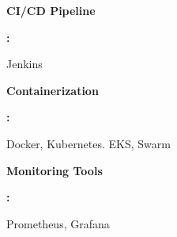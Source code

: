 \documentclass[9pt]{developercv} %
\begin{document}
\begin{minipage}[t]{0.465\textwidth}
    \begin{minipage}[t]{0.3\textwidth}
        \textbf{CI/CD Pipeline}
    \end{minipage}
     \begin{minipage}[t]{0.1\textwidth}
        \textbf{:}
    \end{minipage}
    \hfill
    \begin{minipage}[t]{0.73\textwidth}
      Jenkins
    \end{minipage}

    \begin{minipage}[t]{0.3\textwidth}
        \textbf{Containerization}
    \end{minipage}
    \begin{minipage}[t]{0.1\textwidth}
        \textbf{:}
    \end{minipage}
    \hfill
    \begin{minipage}[t]{0.73\textwidth}
      Docker, Kubernetes. EKS, Swarm
    \end{minipage}

    \begin{minipage}[t]{0.3\textwidth}
        \textbf{Monitoring Tools}
    \end{minipage}
    \begin{minipage}[t]{0.1\textwidth}
        \textbf{:}
    \end{minipage}
    \hfill
    \begin{minipage}[t]{0.73\textwidth}
      Prometheus, Grafana
    \end{minipage}
    
\end{minipage}
\end{document}
